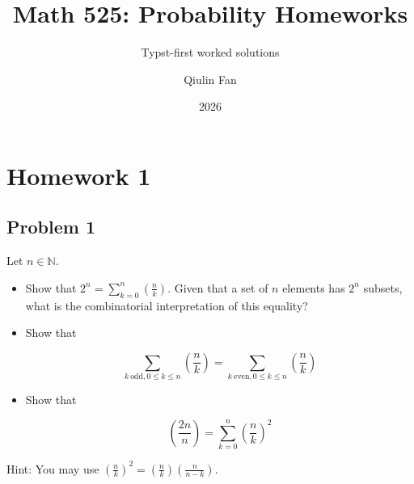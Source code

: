 \documentclass{qlnotes-export}
\title{Math 525: Probability Homeworks}
\subtitle{Typst-first worked solutions}
\author{Qiulin Fan}
\date{2026}
\begin{document}
\mainmatter
\chapter{Homework 1}\label{homework-1}

\section{Problem 1}\label{problem-1-1}

Let \(n \in {\mathbb{N}}\).

\begin{itemize}
\item
  Show that \(2^{n} = \sum_{k = 0}^{n}\left( \frac{n}{k} \right)\). Given that a set of \(n\) elements has \(2^{n}\) subsets, what is the combinatorial interpretation of this equality?
\item
  Show that

  \[\sum\limits_{k\ \text{odd},0 \leq k \leq n}\left( \frac{n}{k} \right) = \sum\limits_{k\ \text{even},0 \leq k \leq n}\left( \frac{n}{k} \right)\]
\item
  Show that

  \[\left( \frac{2n}{n} \right) = \sum\limits_{k = 0}^{n}\left( \frac{n}{k} \right)^{2}\]
\end{itemize}

Hint: You may use \(\left( \frac{n}{k} \right)^{2} = \left( \frac{n}{k} \right)\left( \frac{n}{n - k} \right)\).
\end{document}

